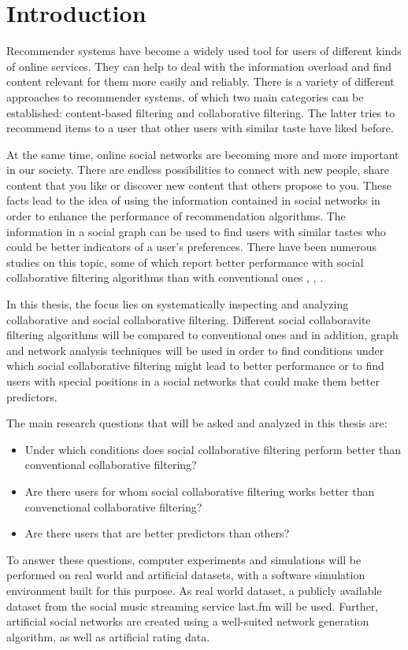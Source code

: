 \chapter{Introduction}
\label{c:einleitung} Recommender systems have become a widely used tool for users of different kinds of online services. They can help to deal with the information overload and find content relevant for them more easily and reliably. There is a variety of different approaches to recommender systems, of which two main categories can be established: content-based filtering and collaborative filtering. The latter tries to recommend items to a user that other users with similar taste have liked before.

At the same time, online social networks are becoming more and more important in our society. There are endless possibilities to connect with new people, share content that you like or discover new content that others propose to you. These facts lead to the idea of using the information contained in social networks in order to enhance the performance of recommendation algorithms. The information in a social graph can be used to find users with similar tastes who could be better indicators of a user's preferences. There have been numerous studies on this topic, some of which report better performance with social collaborative filtering algorithms than with conventional ones \cite{Zheng_2008}, \cite{Konstas_2009}, \cite{Liu_2010}.

In this thesis, the focus lies on systematically inspecting and analyzing collaborative and social collaborative filtering. Different social collaboravite filtering algorithms will be compared to conventional ones and in addition, graph and network analysis techniques will be used in order to find conditions under which social collaborative filtering might lead to better performance or to find users with special positions in a social networks that could make them better predictors.

The main research questions that will be asked and analyzed in this thesis are:
\begin{itemize}
\item Under which conditions does social collaborative filtering perform better than conventional collaborative filtering?
\item Are there users for whom social collaborative filtering works better than convenctional collaborative filtering?
\item Are there users that are better predictors than others?
\end{itemize}

To answer these questions, computer experiments and simulations will be performed on real world and artificial datasets, with a software simulation environment built for this purpose. As real world dataset, a publicly available dataset from the social music streaming service last.fm will be used. Further, artificial social networks are created using a well-suited network generation algorithm, as well as artificial rating data.